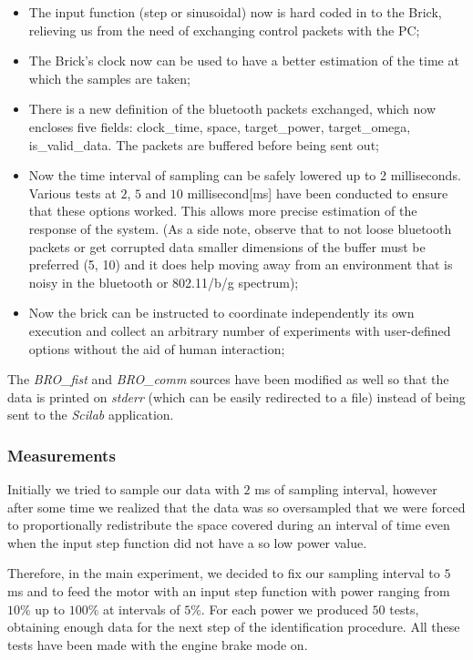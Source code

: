\begin{itemize}
	\item The input function (step or sinusoidal) now is hard coded in to the Brick, relieving us from the need of exchanging control packets with the PC;
	\item The Brick's clock now can be used to have a better estimation of the time at which the samples are taken;
	\item There is a new definition of the bluetooth packets exchanged, which now encloses five fields: clock\_{}time, space, target\_{}power, target\_{}omega, is\_valid\_{}data. The packets are buffered before being sent out;
	\item Now the time interval of sampling can be safely lowered up to 2 milliseconds. Various tests at $2$, $5$ and $10$ millisecond[ms] have been conducted to ensure that these options worked. This allows more precise estimation of the response of the system. (As a side note, observe that to not loose bluetooth packets or get corrupted data smaller dimensions of the buffer must be preferred (5, 10) and it does help moving away from an environment that is noisy in the bluetooth or 802.11/b/g spectrum);
	\item Now the brick can be instructed to coordinate independently its own execution and collect an arbitrary number of experiments with user-defined options without the aid of human interaction; 
\end{itemize}

The \textit{BRO\_{}fist} and \textit{BRO\_{}comm} sources have been modified as well so that the data is printed on \textit{stderr} (which can be easily redirected to a file) instead of being sent to the \textit{Scilab} application.

\subsubsection{Measurements}

Initially we tried to sample our data with $2$ ms of sampling interval, however after some time we realized that the data was so oversampled that we were forced to proportionally redistribute the space covered during an interval of time even when the input step function did not have a so low power value.

Therefore, in the main experiment, we decided to fix our sampling interval to $5$ ms and to feed the motor with an input step function with power ranging from $10\%$ up to $100\%$ at intervals of $5\%$. For each power we produced $50$ tests, obtaining enough data for the next step of the identification procedure. All these tests have been made with the engine brake mode on.

